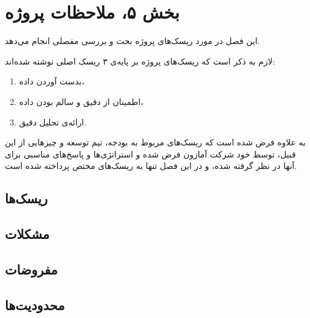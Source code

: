 \chapter{بخش ۵، ملاحظات پروژه\\}

این فصل در مورد ریسک‌های پروژه 
بحث و بررسی مفصلی انجام می‌دهد.

لازم به ذکر است که ریسک‌های پروژه بر پایه‌ی ۳ ریسک اصلی نوشته شده‌اند:
\begin{enumerate}
\item 
بدست‌ آوردن داده،
\item 
اطمینان از دقیق و سالم بودن داده،
\item 
ارائه‌ی تحلیل دقیق.
\end{enumerate}

به علاوه فرض شده است که ریسک‌های مربوط به بودجه، تیم توسعه و چیز‌‌هایی از این قبیل، توسط خود شرکت آمازون فرض شده و استراتژی‌ها و پاسخ‌های مناسبی برای آنها در نظر گرفته شده، و در این فصل تنها به ریسک‌های مختص 
پرداخته شده است.

\section{ریسک‌ها }

\section{مشکلات }

\section{مفروضات }

\section{محدودیت‌ها }

